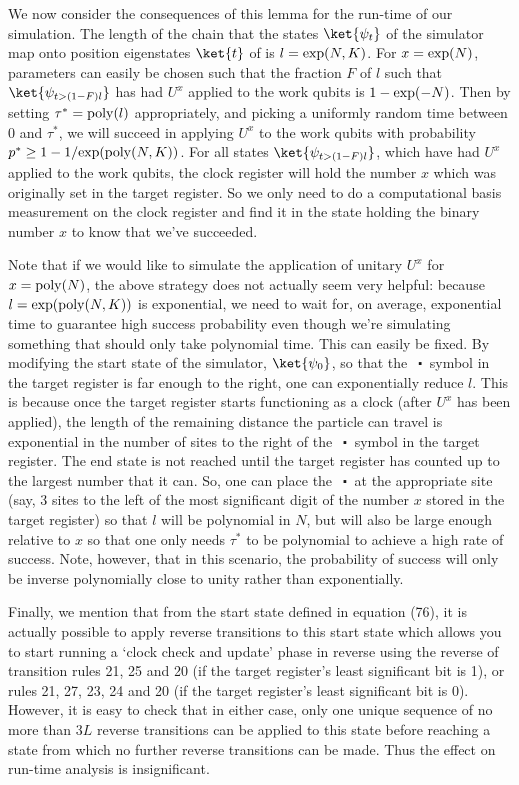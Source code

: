 \documentclass[11pt,letterpaper]{article}
\newcommand{\<}{\langle}
\renewcommand{\>}{\rangle}
\newcommand{\bul}{\:\:\centerdot\:}       %
\begin{document}
We now consider the consequences of this lemma for the run-time of our simulation. The length of the chain that the states $\ket{\psi_t}$ of the simulator map onto position eigenstates $\ket{t}$ of is $l={{\rm{exp}}}(N,K)$. For $x={\rm{exp}}(N)$, parameters can easily be chosen such that the fraction $F$ of $l$ such that $\ket{\psi_{t> (1-F)l}}$ has had $U^x$ applied to the work qubits is $1-{\rm{exp}}(-N)$. Then by setting $\tau^*={\rm{poly}}(l)$ appropriately, and picking a uniformly random time between $0$ and $\tau^*$, we will succeed in applying $U^x$ to the work qubits with probability $p^*\geq 1-1/{\rm{exp}}({\rm{poly}}(N,K))$. For all states $\ket{\psi_{t> (1-F)l}}$, which have had $U^x$ applied to the work qubits, the clock register will hold the number $x$ which was originally set in the target register. So we only need to do a computational basis measurement on the clock register and find it in the state holding the binary number $x$ to know that we've succeeded.

Note that if we would like to simulate the application of unitary $U^x$ for $x={\rm{poly}}(N)$, the above strategy does not actually seem very helpful: because $l={\rm{exp}}({\rm{poly}}(N,K))$ is exponential, we need to wait for, on average, exponential time to guarantee high success probability even though we're simulating something that should only take polynomial time. This can easily be fixed. By modifying the start state of the simulator, $\ket{\psi_0}$, so that the $\bul$ symbol in the target register is far enough to the right, one can exponentially reduce $l$. This is because once the target register starts functioning as a clock (after $U^x$ has been applied), the length of the remaining distance the particle can travel is exponential in the number of sites to the right of the $\bul$ symbol in the target register. The end state is not reached until the target register has counted up to the largest number that it can.  So, one can place the $\bul$ at the appropriate site (say, 3 sites to the left of the most significant digit of the number $x$ stored in the target register) so that $l$ will be polynomial in $N$, but will also be large enough relative to $x$ so that one only needs $\tau^*$ to be polynomial to achieve a high rate of success. Note, however, that in this scenario, the probability of success will only be inverse polynomially close to unity rather than exponentially.

Finally, we mention that from the start state defined in equation (76), it is actually possible to apply reverse transitions to this start state which allows you to start running a `clock check and update' phase in reverse using the reverse of transition rules 21, 25 and 20 (if the target register's least significant bit is 1), or rules 21, 27, 23, 24 and 20 (if the target register's least significant bit is 0). However, it is easy to check that in either case, only one unique sequence of no more than $3L$ reverse transitions can be applied to this state before reaching a state from which no further reverse transitions can be made. Thus the effect on run-time analysis is insignificant.
\end{document}
